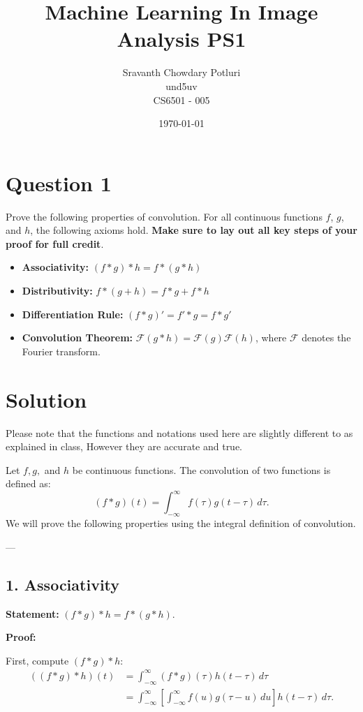 \documentclass[a4paper,12pt]{article}
\title{Machine Learning In Image Analysis PS1}
\author{Sravanth Chowdary Potluri \\ und5uv \\ CS6501 - 005}
\date{\today}
\begin{document}
\maketitle

\section{Question 1}
Prove the following properties of convolution. For all continuous functions $f$, $g$, and $h$, the following axioms hold. \textbf{Make sure to lay out all key steps of your proof for full credit}.

\begin{itemize}
    \item \textbf{Associativity:} $(f \ast g) \ast h = f \ast (g \ast h)$
    \item \textbf{Distributivity:} $f \ast (g + h) = f \ast g + f \ast h$
    \item \textbf{Differentiation Rule:} $(f \ast g)' = f' \ast g = f \ast g'$
    \item \textbf{Convolution Theorem:} $\mathcal{F}(g \ast h) = \mathcal{F}(g) \mathcal{F}(h)$, where $\mathcal{F}$ denotes the Fourier transform.
\end{itemize}



\section*{Solution}
Please note that the functions and notations used here are slightly different to as explained in class, However they are accurate and true.

Let \( f, g, \) and \( h \) be continuous functions. The convolution of two functions is defined as:
\[
(f \ast g)(t) = \int_{-\infty}^{\infty} f(\tau) g(t - \tau) \, d\tau.
\]
We will prove the following properties using the integral definition of convolution.

---

\subsection*{1. Associativity}
\textbf{Statement:} \( (f \ast g) \ast h = f \ast (g \ast h) \).

\textbf{Proof:}

First, compute \( (f \ast g) \ast h \):
\[
\begin{aligned}
((f \ast g) \ast h)(t) &= \int_{-\infty}^{\infty} (f \ast g)(\tau) h(t - \tau) \, d\tau \\
&= \int_{-\infty}^{\infty} \left[ \int_{-\infty}^{\infty} f(u) g(\tau - u) \, du \right] h(t - \tau) \, d\tau.
\end{aligned}
\]
\end{document}
